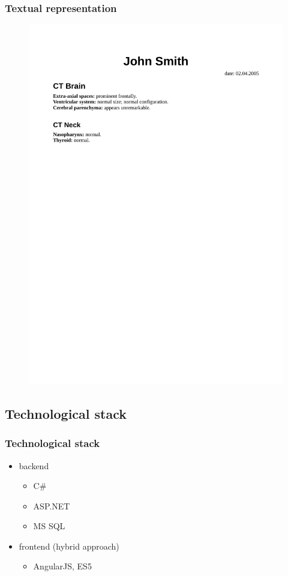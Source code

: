 \documentclass{beamer}
\begin{document}
\begin{frame}
\frametitle{Textual representation}
\begin{figure}
	\centering
	\includegraphics[width=\linewidth]{../rendered-report}
	\label{fig:rendered-report}
\end{figure}
\end{frame}

\subsection{Technological stack}
\begin{frame}
\frametitle{Technological stack}
\begin{itemize}
	\item backend 
	\begin{itemize}
		\item C\#
		\item ASP.NET
		\item MS SQL 
	\end{itemize}
	\item frontend (hybrid approach)
	\begin{itemize}
		\item AngularJS, ES5 
	\end{itemize}
\end{itemize}

\end{frame}
\end{document}
